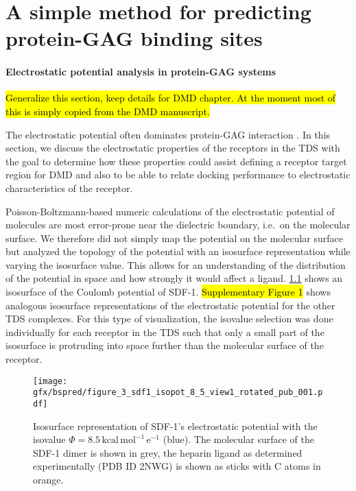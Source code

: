 \chapter{A simple method for predicting protein-GAG binding sites}

\subsubsection{Electrostatic potential analysis in protein-GAG systems}

\hl{Generalize this section, keep details for DMD chapter. At the moment most of
this is simply copied from the DMD manuscript.}

The electrostatic potential often dominates protein-GAG interaction
\cite{gandhi_structure_2008}. In this section, we discuss the electrostatic
properties of the receptors in the TDS with the goal to determine how these
properties could assist defining a receptor target region for DMD and also to be
able to relate docking performance to electrostatic characteristics of the
receptor.


Poisson-Boltzmann-based numeric calculations of the electrostatic potential of
molecules are most error-prone near the dielectric boundary, i.e.\ on the
molecular surface. We therefore did not simply map the potential on the
molecular surface but analyzed the topology of the potential with an isosurface
representation while varying the isosurface value. This allows for an
understanding  of the distribution of the potential in space and how strongly it
would affect a ligand. \cref{fig:bspred:sdf1_estatic} shows an isosurface of the
Coulomb potential of SDF-1. \hl{Supplementary Figure 1} shows analogous
isosurface representations of the electrostatic potential for the other TDS
complexes. For this type of visualization, the isovalue selection was done
individually for each receptor in the TDS such that only a small part of the
isosurface is protruding into space further than the molecular surface of the
receptor.

\begin{figure}
\centering
\texttt{[image: gfx/bspred/figure\_3\_sdf1\_isopot\_8\_5\_view1\_rotated\_pub\_001.pdf]}
\caption[]{
Isosurface representation of SDF-1's electrostatic potential with the isovalue $\Phi = 8.5\,\mathrm{kcal\,mol^{-1}\,e^{-1}}$ (blue). The molecular surface of the SDF-1 dimer is
shown in grey, the heparin ligand as determined experimentally (PDB ID 2NWG) is shown as sticks
with C atoms in orange.
}
\label{fig:bspred:sdf1_estatic}
\end{figure}

